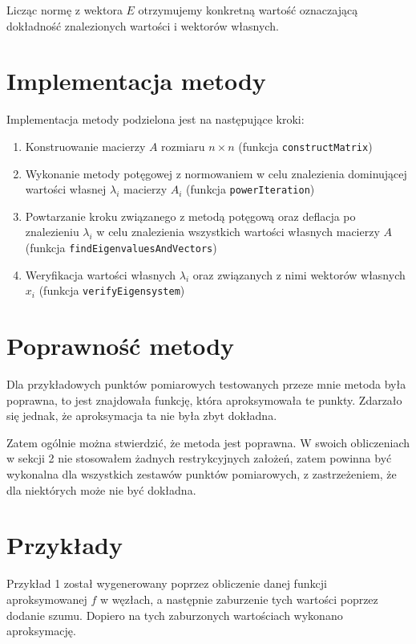 \documentclass[12pt]{article}
\begin{document}
	Licząc normę z wektora $E$ otrzymujemy konkretną wartość oznaczającą dokładność znalezionych wartości i wektorów własnych.
	
	\section{Implementacja metody}
	Implementacja metody podzielona jest na następujące kroki:
	\begin{enumerate}
		\item Konstruowanie macierzy $A$ rozmiaru $n \times n$ (funkcja \texttt{constructMatrix})
		\item Wykonanie metody potęgowej z normowaniem w celu znalezienia dominującej wartości własnej $\lambda_i$ macierzy $A_i$ (funkcja \texttt{powerIteration})
		\item Powtarzanie kroku związanego z metodą potęgową oraz deflacja po znalezieniu $\lambda_i$ w celu znalezienia wszystkich wartości własnych macierzy $A$ (funkcja \texttt{findEigenvaluesAndVectors})
		\item Weryfikacja wartości własnych $\lambda_i$ oraz związanych z nimi wektorów własnych $x_i$ (funkcja \texttt{verifyEigensystem})
	\end{enumerate}

	
	
	\section{Poprawność metody}
	Dla przykładowych punktów pomiarowych testowanych przeze mnie metoda była poprawna, to jest znajdowała funkcję, która aproksymowała te punkty. Zdarzało się jednak, że aproksymacja ta nie była zbyt dokładna.
	
	Zatem ogólnie można stwierdzić, że metoda jest poprawna. W swoich obliczeniach w sekcji 2 nie stosowałem żadnych restrykcyjnych założeń, zatem powinna być wykonalna dla wszystkich zestawów punktów pomiarowych, z zastrzeżeniem, że dla niektórych może nie być dokładna.
	
	
	
	
	\section{Przykłady}
	Przykład 1 został wygenerowany poprzez obliczenie danej funkcji aproksymowanej $f$ w węzłach, a następnie zaburzenie tych wartości poprzez dodanie szumu. Dopiero na tych zaburzonych wartościach wykonano aproksymację.
	
\end{document}

